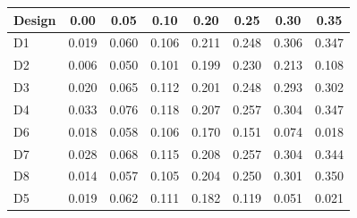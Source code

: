\begin{tabular}{lccccccc}
\toprule
Design & 0.00 & 0.05 & 0.10 & 0.20 & 0.25 & 0.30 & 0.35 \\
\midrule
D1 & 0.019 & 0.060 & 0.106 & 0.211 & 0.248 & 0.306 & 0.347 \\
D2 & 0.006 & 0.050 & 0.101 & 0.199 & 0.230 & 0.213 & 0.108 \\
D3 & 0.020 & 0.065 & 0.112 & 0.201 & 0.248 & 0.293 & 0.302 \\
D4 & 0.033 & 0.076 & 0.118 & 0.207 & 0.257 & 0.304 & 0.347 \\
D6 & 0.018 & 0.058 & 0.106 & 0.170 & 0.151 & 0.074 & 0.018 \\
D7 & 0.028 & 0.068 & 0.115 & 0.208 & 0.257 & 0.304 & 0.344 \\
D8 & 0.014 & 0.057 & 0.105 & 0.204 & 0.250 & 0.301 & 0.350 \\
D5 & 0.019 & 0.062 & 0.111 & 0.182 & 0.119 & 0.051 & 0.021 \\
\bottomrule
\end{tabular}